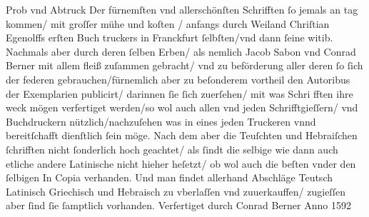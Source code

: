 \documentclass[]{article}
\begin{document}
\fraktur
\tiny
\noindent
Prob vnd Abtruck Der fürnemſten vnd allerschönſten Schrifften ſo jemals an tag kommen/ mit groſſer mühe und koſten / anfangs durch Weiland Chriſtian Egenolffs erſten Buch\newline
truckers in Franckfurt ſelbſten/vnd dann ſeine witib. Nachmals aber durch deren ſelben Erben/ als nemlich Jacob Sabon vnd Conrad Berner mit allem fleiß zuſammen gebracht/ vnd\newline
zu beförderung aller deren ſo ſich der federen gebrauchen/fürnemlich aber zu beſonderem vortheil den Autoribus der \normalfont Exemplarien publicirt\fraktur / darinnen ſie ſich zuerſehen/ mit was Schri\newline
fften ihre weck mögen verfertiget werden/so wol auch allen vnd jeden Schrifftgieſſern/ vnd Buchdruckern nützlich/nachzuſehen was in eines jeden Truckeren vnnd bereitſchafft dienſtlich\newline
ſein möge. Nach dem aber die Teuſchten und Hebraiſchen ſchrifften nicht ſonderlich hoch geachtet/ als ſindt die selbige wie dann auch etliche andere Latinische nicht hieher heſetzt/ ob wol\newline
auch die beſten vnder den ſelbigen \normalfont In Copia \fraktur verhanden. Und man findet allerhand Abschläge Teutsch Latinisch Griechisch und Hebraisch zu vberlaſſen vnd zuuerkauffen/ zugieſſen aber\newline
ſind ſie ſamptlich vorhanden. Verfertiget durch Conrad Berner Anno 1592
\end{document}
